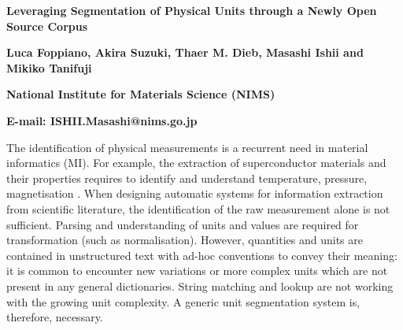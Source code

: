 \documentclass[a4j,11pt]{article}
\begin{document}
\renewcommand{\baselinestretch}{1.12}\small\normalsize

\begin{center}
  
  \textbf{\large Leveraging Segmentation of Physical Units through a Newly Open Source Corpus}
  
  \textbf{Luca Foppiano, Akira Suzuki, Thaer M. Dieb, Masashi Ishii and Mikiko Tanifuji}
  
  \textbf{National Institute for Materials Science (NIMS)}
  
  \textbf{E-mail: ISHII.Masashi@nims.go.jp}
\end{center}


The identification of physical measurements is a recurrent need in material informatics (MI). For example, the extraction of superconductor materials and their properties requires to identify and understand temperature, pressure, magnetisation \autocite{foppiano2019proposal}.
When designing automatic systems for information extraction from scientific literature, the identification of the raw measurement alone is not sufficient. Parsing and understanding of units and values are required for transformation (such as normalisation). 
However, quantities and units are contained in unstructured text with ad-hoc conventions to convey their meaning: it is common to encounter new variations or more complex units which are not present in any general dictionaries. String matching and lookup are not working with the growing unit complexity. A generic unit segmentation system is, therefore, necessary.
\end{document}
